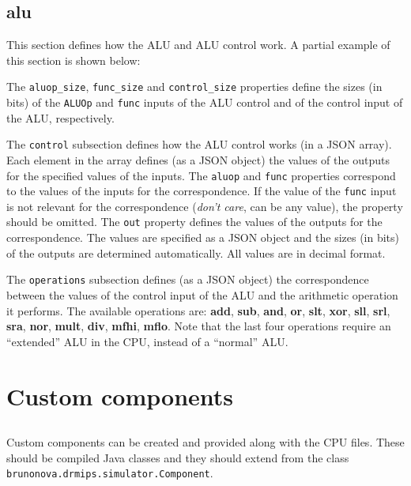 \documentclass[11pt,a4paper,twoside,titlepage]{report}
\begin{document}
\section{alu}

This section defines how the ALU and ALU control work.
A partial example of this section is shown below:



The \verb+aluop_size+, \verb+func_size+ and \verb+control_size+ properties
define the sizes (in bits) of the \verb+ALUOp+ and \verb+func+ inputs of the
ALU control and of the control input of the ALU, respectively.

The \verb+control+ subsection defines how the ALU control works (in a JSON array).
Each element in the array defines (as a JSON object) the values of the outputs
for the specified values of the inputs.
The \verb+aluop+ and \verb+func+ properties correspond to the values of the
inputs for the correspondence. If the value of the \verb+func+ input is not relevant
for the correspondence (\emph{don't care}, can be any value), the property 
should be omitted.
The \verb+out+ property defines the values of the outputs for the correspondence.
The values are specified as a JSON object and the sizes (in bits) of the outputs
are determined automatically.
All values are in decimal format.

The \verb+operations+ subsection defines (as a JSON object) the correspondence 
between the values of the control input of the ALU and the arithmetic operation 
it performs.
The available operations are: \textbf{add}, \textbf{sub}, \textbf{and}, \textbf{or},
\textbf{slt}, \textbf{xor}, \textbf{sll}, \textbf{srl}, \textbf{sra}, \textbf{nor},
\textbf{mult}, \textbf{div}, \textbf{mfhi}, \textbf{mflo}.
Note that the last four operations require an ``extended'' ALU in the CPU, instead 
of a ``normal'' ALU.


\chapter{Custom components} \label{ch:custom_comps}

\section*{}

Custom components can be created and provided along with the CPU files.
These should be compiled Java classes and they should extend from the class
\verb+brunonova.drmips.simulator.Component+.
\end{document}
